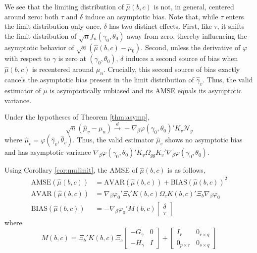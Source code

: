 We see that the limiting distribution of $\widehat{\mu}(b,c)$ is not, in general, centered around zero: both $\tau$ and $\delta$ induce an asymptotic bias. 
Note that, while $\tau$ enters the limit distribution only once, $\delta$ has two distinct effects. 
First, like $\tau$, it shifts the limit distribution of $\sqrt{n}f_n(\gamma_0, \theta_0)$ away from zero, thereby influencing the asymptotic behavior of $\sqrt{n}\left(\widehat{\mu}(b,c) - \mu_0 \right)$. 
Second, unless the derivative of $\varphi$ with respect to $\gamma$ is zero at $(\gamma_0, \theta_0)$, $\delta$ induces a second source of bias when $\widehat{\mu}(b,c)$ is recentered around $\mu_n$. 
Crucially, this second source of bias exactly cancels the asymptotic bias present in the limit distribution of $\widehat{\gamma}_v$. 
Thus, the valid estimator of $\mu$ is asymptotically unbiased and its AMSE equals its asymptotic variance.
\begin{cor}
\label{cor:muvalid}
Under the hypotheses of Theorem \ref{thm:asymp},
	$$\sqrt{n}\left( \widehat{\mu}_v - \mu_n\right) \overset{d}{\rightarrow} -\nabla_\beta \varphi(\gamma_0, \theta_0)' K_v\mathscr{N}_g$$
where $\widehat{\mu}_v = \varphi(\widehat{\gamma}_v,\widehat{\theta}_v)$. Thus, the valid estimator $\widehat{\mu}_v$ shows no asymptotic bias and has asymptotic variance $\nabla_\beta \varphi(\gamma_0, \theta_0)'K_v \Omega_{gg}K_v'\nabla_\beta \varphi(\gamma_0, \theta_0)$.
\end{cor}
 
Using Corollary \ref{cor:mulimit}, the AMSE of $\widehat{\mu}(b,c)$ is as follows,
	\begin{align}
	\label{eq:AMSE}
		\mbox{AMSE}\left(\widehat{\mu}(b,c)\right) &= \mbox{AVAR}\left(\widehat{\mu}\left(b,c\right)\right)  + \mbox{BIAS}\left(\widehat{\mu}\left(b,c\right)\right)^2\\
		\mbox{AVAR}\left(\widehat{\mu}\left(b,c\right)\right) &= \nabla_\beta\varphi_0'\Xi_b '  K(b,c)\Omega_c K(b,c)'\Xi_b\nabla_\beta\varphi_0\\
		\mbox{BIAS}\left(\widehat{\mu}\left(b,c\right)\right) &= -\nabla_{\beta} \varphi_0' M(b,c)\left[\begin{array}{c} \delta \\ \tau\end{array} \right]
		\label{eq:bias}
\end{align}
where
\begin{equation}
	M(b,c) = \Xi_b'K(b,c) \Xi_c \left[\begin{array}{cc} -G_\gamma & 0 \\ -H_\gamma & I \end{array} \right] +\left[\begin{array}{ll} I_r & 0_{r\times q} \\ 0_{p\times r} & 0_{s\times q} \end{array} \right]
\end{equation}

